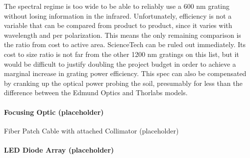 The spectral regime is too wide to be able to reliably use a 600 nm grating without losing information in the infrared. Unfortunately, efficiency is not a variable that can be compared from product to product, since it varies with wavelength and per polarization. This means the only remaining comparison is the ratio from cost to active area. ScienceTech can be ruled out immediately. Its cost to size ratio is not far from the other 1200 nm gratings on this list, but it would be difficult to justify doubling the project budget in order to achieve a marginal increase in grating power efficiency. This spec can also be compensated by cranking up the optical power probing the soil, presumably for less than the  difference between the Edmund Optics and Thorlabs models.


\paragraph{Focusing Optic (placeholder)}

Fiber Patch Cable with attached Collimator (placeholder)

\paragraph{LED Diode Array (placeholder)}


